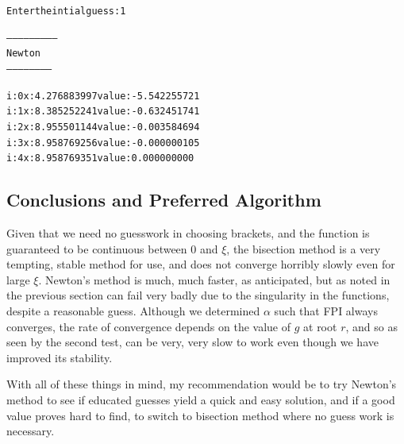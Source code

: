 \documentclass[11pt]{article} %
\begin{document}
\begin{alltt}
Enter the intial guess: 1

--------------------------
 Newton
 -----------------------


i: 0	x: 4.276883997	value: -5.542255721
i: 1	x: 8.385252241	value: -0.632451741
i: 2	x: 8.955501144	value: -0.003584694
i: 3	x: 8.958769256	value: -0.000000105
i: 4	x: 8.958769351	value: 0.000000000
\end{alltt}

\subsection*{Conclusions and Preferred Algorithm}
 Given that we need no guesswork in choosing brackets, and the function is guaranteed to be continuous between $0$ and $\xi$, the bisection method is a very tempting, stable method for use, and does not converge horribly slowly even for large $\xi$. Newton's method is much, much faster, as anticipated, but as noted in the previous section can fail very badly due to the singularity in the functions, despite a reasonable guess. Although we determined $\alpha$ such that FPI always converges, the rate of convergence depends on the value of $g$ at root $r$, and so as seen by the second test, can be very, very slow to work even though we have improved its stability.
\par With all of these things in mind, my recommendation would be to try Newton's method to see if educated guesses yield a quick and easy solution, and if a good value proves hard to find, to switch to bisection method where no guess work is necessary. 
\end{document}
